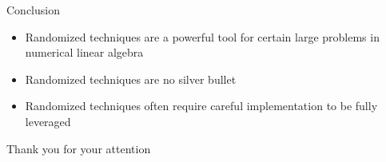 \documentclass{beamer}
\newcommand{\bitem}{\item[$\bullet$]}
\begin{document}
\begin{frame}{Conclusion}

\begin{itemize}
    \bitem Randomized techniques are a powerful tool for certain large problems in numerical linear algebra 
    \bitem Randomized techniques are no silver bullet
    \bitem Randomized techniques often require careful implementation to be fully leveraged
\end{itemize}
    
\end{frame}

\begin{frame}{}

\begin{center}
\begin{huge}
    Thank you for your attention
\end{huge}
\end{center}
\end{frame}
\end{document}
